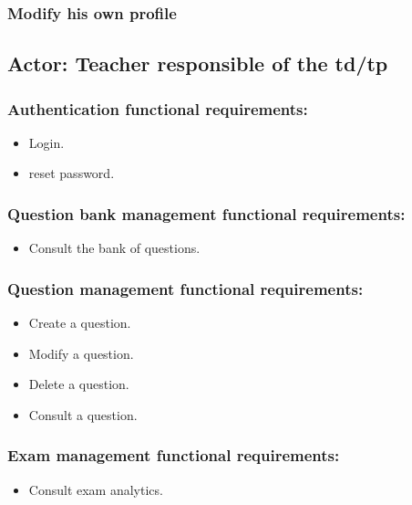 \documentclass[a4paper,12p]{article}
\begin{document}
        \subsubsection{Modify his own profile}


     \subsection{Actor: Teacher responsible of the td/tp}
     \subsubsection{Authentication functional requirements:}
     \begin{itemize}
         \item Login.
         \item reset password.
     \end{itemize}

     \subsubsection{Question bank management functional requirements:}
     \begin{itemize}
         \item Consult the bank of questions.
     \end{itemize}

     \subsubsection{Question management functional requirements:}
     \begin{itemize}
         \item Create a question.
         \item Modify a question.
         \item Delete a question.
         \item Consult a question.
     \end{itemize}

     \subsubsection{Exam management functional requirements:}
     \begin{itemize}
         \item Consult exam analytics.
     \end{itemize}
\end{document}
